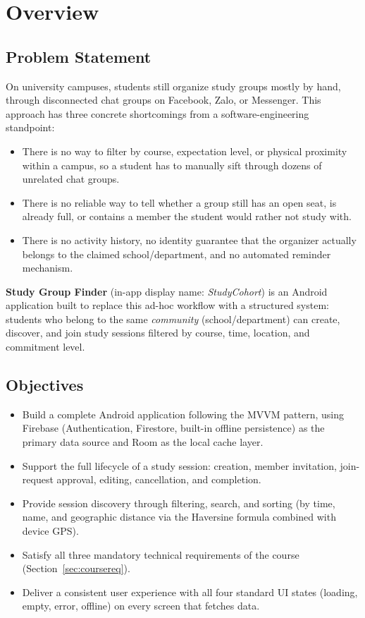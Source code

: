 \section{Overview}

\subsection{Problem Statement}

On university campuses, students still organize study groups mostly by hand, through disconnected chat groups on Facebook, Zalo, or Messenger. This approach has three concrete shortcomings from a software-engineering standpoint:

\begin{itemize}
    \item There is no way to filter by course, expectation level, or physical proximity within a campus, so a student has to manually sift through dozens of unrelated chat groups.
    \item There is no reliable way to tell whether a group still has an open seat, is already full, or contains a member the student would rather not study with.
    \item There is no activity history, no identity guarantee that the organizer actually belongs to the claimed school/department, and no automated reminder mechanism.
\end{itemize}

\textbf{Study Group Finder} (in-app display name: \emph{StudyCohort}) is an Android application built to replace this ad-hoc workflow with a structured system: students who belong to the same \emph{community} (school/department) can create, discover, and join study sessions filtered by course, time, location, and commitment level.

\subsection{Objectives}

\begin{itemize}
    \item Build a complete Android application following the MVVM pattern, using Firebase (Authentication, Firestore, built-in offline persistence) as the primary data source and Room as the local cache layer.
    \item Support the full lifecycle of a study session: creation, member invitation, join-request approval, editing, cancellation, and completion.
    \item Provide session discovery through filtering, search, and sorting (by time, name, and geographic distance via the Haversine formula combined with device GPS).
    \item Satisfy all three mandatory technical requirements of the course (Section~\ref{sec:coursereq}).
    \item Deliver a consistent user experience with all four standard UI states (loading, empty, error, offline) on every screen that fetches data.
\end{itemize}

